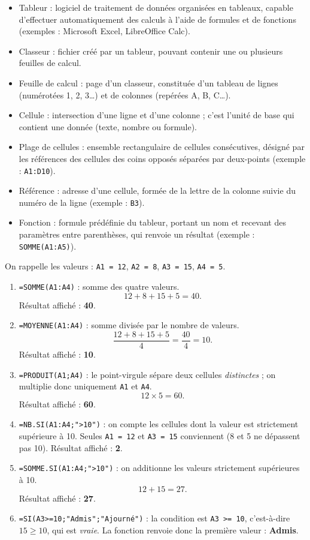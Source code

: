 \documentclass[11pt]{article}
\newcommand{\cle}[1]{{\popxbold\color{popdark}#1}}
\begin{document}
\begin{corrige}\tcblower
\begin{itemize}
\item \cle{Tableur} : logiciel de traitement de données organisées en tableaux, capable d'effectuer automatiquement des calculs à l'aide de formules et de fonctions (exemples : Microsoft Excel, LibreOffice Calc).
\item \cle{Classeur} : fichier créé par un tableur, pouvant contenir une ou plusieurs feuilles de calcul.
\item \cle{Feuille de calcul} : page d'un classeur, constituée d'un tableau de lignes (numérotées 1, 2, 3\dots) et de colonnes (repérées A, B, C\dots).
\item \cle{Cellule} : intersection d'une ligne et d'une colonne ; c'est l'unité de base qui contient une donnée (texte, nombre ou formule).
\item \cle{Plage de cellules} : ensemble rectangulaire de cellules consécutives, désigné par les références des cellules des coins opposés séparées par deux-points (exemple : \texttt{A1:D10}).
\item \cle{Référence} : adresse d'une cellule, formée de la lettre de la colonne suivie du numéro de la ligne (exemple : \texttt{B3}).
\item \cle{Fonction} : formule prédéfinie du tableur, portant un nom et recevant des paramètres entre parenthèses, qui renvoie un résultat (exemple : \texttt{SOMME(A1:A5)}).
\end{itemize}
\end{corrige}

\begin{corrige}\tcblower
On rappelle les valeurs : \texttt{A1 = 12}, \texttt{A2 = 8}, \texttt{A3 = 15}, \texttt{A4 = 5}.
\begin{enumerate}
\item \texttt{=SOMME(A1:A4)} : somme des quatre valeurs.
\[ 12 + 8 + 15 + 5 = 40. \]
Résultat affiché : \textbf{40}.
\item \texttt{=MOYENNE(A1:A4)} : somme divisée par le nombre de valeurs.
\[ \frac{12 + 8 + 15 + 5}{4} = \frac{40}{4} = 10. \]
Résultat affiché : \textbf{10}.
\item \texttt{=PRODUIT(A1;A4)} : le point-virgule sépare deux cellules \emph{distinctes} ; on multiplie donc uniquement \texttt{A1} et \texttt{A4}.
\[ 12 \times 5 = 60. \]
Résultat affiché : \textbf{60}.
\item \texttt{=NB.SI(A1:A4;">10")} : on compte les cellules dont la valeur est strictement supérieure à 10. Seules \texttt{A1 = 12} et \texttt{A3 = 15} conviennent (8 et 5 ne dépassent pas 10). Résultat affiché : \textbf{2}.
\item \texttt{=SOMME.SI(A1:A4;">10")} : on additionne les valeurs strictement supérieures à 10.
\[ 12 + 15 = 27. \]
Résultat affiché : \textbf{27}.
\item \texttt{=SI(A3>=10;"Admis";"Ajourné")} : la condition est \texttt{A3 >= 10}, c'est-à-dire $15 \geq 10$, qui est \emph{vraie}. La fonction renvoie donc la première valeur : \textbf{Admis}.
\end{enumerate}
\end{corrige}
\end{document}
